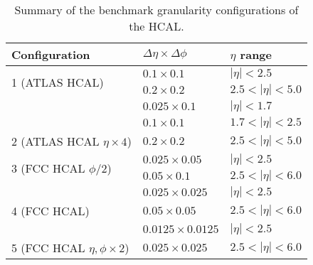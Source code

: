 \begin{table}
	\centering
	\begin{tabular}{lll}
		\toprule 
		\textbf{Configuration} & $\Delta \eta \times \Delta \phi$ & $\eta$ range\\
		\midrule
		\multirow{2}{*}{1 (ATLAS HCAL)} & $0.1\times 0.1$  & $|\eta|<2.5$\\
		& $0.2\times 0.2$ & $2.5<|\eta|<5.0$ \\
		\cellcolor{black!7} &\cellcolor{black!7} $0.025\times 0.1$  & \cellcolor{black!7}$|\eta|<1.7$\\
		\cellcolor{black!7} & \cellcolor{black!7}$0.1\times 0.1$  & \cellcolor{black!7}$1.7<|\eta|<2.5$\\
		\multirow{-3}{*}{2 (ATLAS HCAL $\eta\times 4$)} \cellcolor{black!7}& \cellcolor{black!7}$0.2\times 0.2$  &\cellcolor{black!7} $2.5<|\eta|<5.0$\\
		\multirow{2}{*}{3 (FCC HCAL $\phi/2 $)}& $0.025\times0.05$ & $|\eta|<2.5$\\
		& $0.05\times 0.1$ & $2.5<|\eta|<6.0$ \\
		 \cellcolor{black!7}&  \cellcolor{black!7}$0.025\times0.025$ &  \cellcolor{black!7}$|\eta|<2.5$\\
		 \multirow{-2}{*}{4 (FCC HCAL)}\cellcolor{black!7}&  \cellcolor{black!7}$0.05\times 0.05$ & \cellcolor{black!7} $2.5<|\eta|<6.0$ \\
		& $0.0125\times0.0125$ &$|\eta|<2.5$\\
		\multirow{-2}{*}{5 (FCC HCAL $\eta,\phi\times 2$)}&$0.025\times 0.025$ & $2.5<|\eta|<6.0$\\
		\bottomrule
	\end{tabular}
	\caption{Summary of the benchmark granularity configurations of the HCAL.}
	\label{table:Gran}
\end{table}

